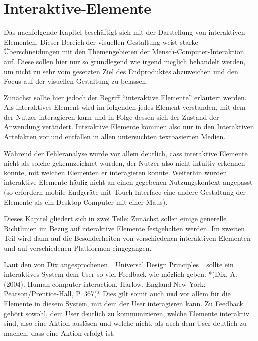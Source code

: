 
\newcommand{\chaptertitle}{Interaktive-Elemente}

\chapter{\chaptertitle} %

\label{Interaktive-Elemente} %

\lhead{\chaptername{} \thechapter{} - \emph{\chaptertitle}} %


Das nachfolgende Kapitel beschäftigt sich mit der Darstellung von interaktiven Elementen. Dieser Bereich der visuellen Gestaltung weist starke Überschneidungen mit den Themengebieten der Mensch-Computer-Interaktion auf. Diese sollen hier nur so grundlegend wie irgend möglich behandelt werden, um nicht zu sehr vom gesetzten Ziel des Endproduktes abzuweichen und den Focus auf der visuellen Gestaltung zu belassen.

Zunächst sollte hier jedoch der Begriff “interaktive Elemente” erläutert werden. Als interaktives Element wird im folgenden jedes Element verstanden, mit dem der Nutzer interagieren kann und in Folge dessen sich der Zustand der Anwendung verändert. Interaktive Elemente kommen also nur in den Interaktiven Artefakten vor und entfallen in allen untersuchten textbasierten Medien.

Während der Fehleranalyse wurde vor allem deutlich, dass interaktive Elemente nicht als solche gekennzeichnet wurden, der Nutzer also nicht intuitiv erkennen konnte, mit welchen Elementen er interagieren konnte. Weiterhin wurden interaktive Elemente häufig nicht an einen gegebenen Nutzungskontext angepasst (so erfordern mobile Endgeräte mit Touch-Interface eine andere Gestaltung der Elemente als ein Desktop-Computer mit einer Maus).

Dieses Kapitel gliedert sich in zwei Teile: Zunächst sollen einige generelle Richtlinien im Bezug auf interaktive Elemente festgehalten werden. Im zweiten Teil wird dann auf die Besonderheiten von verschiedenen interaktiven Elementen und auf verschiedenen Plattformen eingegangen.

Laut den von Dix angesprochenen _Universal Design Principles_ sollte ein interaktives System dem User so viel Feedback wie möglich geben. *(Dix, A. (2004). Human-computer interaction. Harlow, England New York: Pearson/Prentice-Hall, P. 367)* Dies gilt somit auch und vor allem für die Elemente in diesem System, mit dem der User interagieren kann.
Zu Feedback gehört sowohl, dem User deutlich zu kommunizieren, welche Elemente interaktiv sind, also eine Aktion auslösen und welche nicht, als auch dem User deutlich zu machen, dass eine Aktion erfolgt ist.

